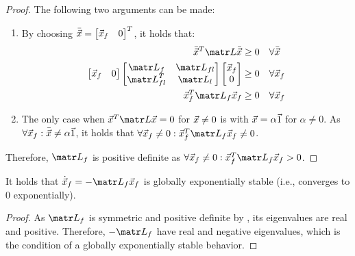 \begin{lemma}
\begin{proof}
        The following two arguments can be made:
        \begin{enumerate}
            \item By choosing $\bar{{\vec{x}}} = \begin{bmatrix} {\vec{x}}_f & 0 \end{bmatrix}^T$, it holds that:
                \[
                    \begin{aligned}
                        \bar{\x}^T \lap \bar{\x} &\geq 0 & & \forall \bar{\x} \\
                        \begin{bmatrix} \x_f & 0 \end{bmatrix}
                        \begin{bmatrix}
                            \lap_f & \lap_{fl} \\
                            \lap_{fl}^T & \lap_{l} \\
                        \end{bmatrix}
                        \begin{bmatrix} \x_f \\ 0 \end{bmatrix} &\geq 0 & & \forall \x_f \\
                        \x_f^T \lap_f \x_f &\geq 0 & & \forall \x_f
                    \end{aligned}
                \]
            \item The only case when $\x^T \lap \x = 0$ for ${\vec{x}} \neq 0$ is with ${\vec{x}} = \alpha\vec{1}$ for $\alpha \neq 0$. As $\forall {\vec{x}}_f: \bar{{\vec{x}}} \neq \alpha\vec{1}$, it holds that $\forall \x_f \neq 0: \x_f^T \lap_f \x_f \neq 0$.
        \end{enumerate}
        Therefore, $\lap_f$ is positive definite as $\forall \x_f \neq 0: \x_f^T \lap_f \x_f > 0$.
    \end{proof}
\end{lemma}

\begin{lemma} \label{th:laplacian_globally_exponentially_stable}
    It holds that $\dot{\x}_f = -\lap_f \x_f$ is globally exponentially stable (i.e., converges to $0$ exponentially).

    \begin{proof}
        As $\lap_f$ is symmetric and positive definite by , its eigenvalues are real and positive. Therefore, $-\lap_f$ have real and negative eigenvalues, which is the condition of a globally exponentially stable behavior.
    \end{proof}
\end{lemma}

